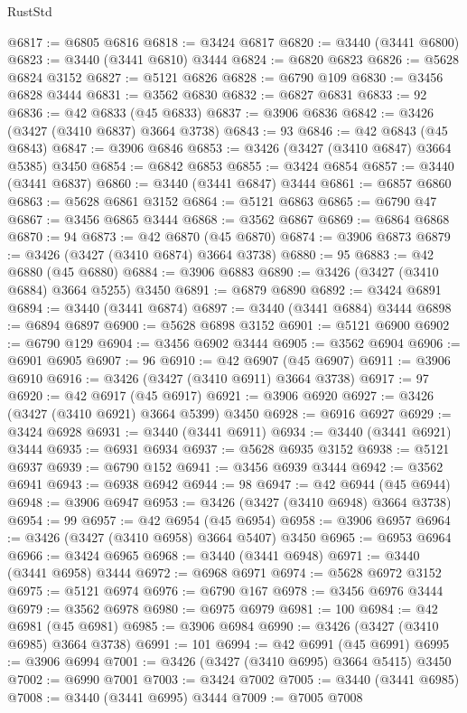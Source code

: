 \begin{lexlean}{RustStd}
\begin{coremodule}
@6817 := @6805 @6816
@6818 := @3424 @6817
@6820 := @3440 (@3441 @6800)
@6823 := @3440 (@3441 @6810) @3444
@6824 := @6820 @6823
@6826 := @5628 @6824 @3152
@6827 := @5121 @6826
@6828 := @6790 @109
@6830 := @3456 @6828 @3444
@6831 := @3562 @6830
@6832 := @6827 @6831
@6833 := 92
@6836 := @42 @6833 (@45 @6833)
@6837 := @3906 @6836
@6842 := @3426 (@3427 (@3410 @6837) @3664 @3738)
@6843 := 93
@6846 := @42 @6843 (@45 @6843)
@6847 := @3906 @6846
@6853 := @3426 (@3427 (@3410 @6847) @3664 @5385) @3450
@6854 := @6842 @6853
@6855 := @3424 @6854
@6857 := @3440 (@3441 @6837)
@6860 := @3440 (@3441 @6847) @3444
@6861 := @6857 @6860
@6863 := @5628 @6861 @3152
@6864 := @5121 @6863
@6865 := @6790 @47
@6867 := @3456 @6865 @3444
@6868 := @3562 @6867
@6869 := @6864 @6868
@6870 := 94
@6873 := @42 @6870 (@45 @6870)
@6874 := @3906 @6873
@6879 := @3426 (@3427 (@3410 @6874) @3664 @3738)
@6880 := 95
@6883 := @42 @6880 (@45 @6880)
@6884 := @3906 @6883
@6890 := @3426 (@3427 (@3410 @6884) @3664 @5255) @3450
@6891 := @6879 @6890
@6892 := @3424 @6891
@6894 := @3440 (@3441 @6874)
@6897 := @3440 (@3441 @6884) @3444
@6898 := @6894 @6897
@6900 := @5628 @6898 @3152
@6901 := @5121 @6900
@6902 := @6790 @129
@6904 := @3456 @6902 @3444
@6905 := @3562 @6904
@6906 := @6901 @6905
@6907 := 96
@6910 := @42 @6907 (@45 @6907)
@6911 := @3906 @6910
@6916 := @3426 (@3427 (@3410 @6911) @3664 @3738)
@6917 := 97
@6920 := @42 @6917 (@45 @6917)
@6921 := @3906 @6920
@6927 := @3426 (@3427 (@3410 @6921) @3664 @5399) @3450
@6928 := @6916 @6927
@6929 := @3424 @6928
@6931 := @3440 (@3441 @6911)
@6934 := @3440 (@3441 @6921) @3444
@6935 := @6931 @6934
@6937 := @5628 @6935 @3152
@6938 := @5121 @6937
@6939 := @6790 @152
@6941 := @3456 @6939 @3444
@6942 := @3562 @6941
@6943 := @6938 @6942
@6944 := 98
@6947 := @42 @6944 (@45 @6944)
@6948 := @3906 @6947
@6953 := @3426 (@3427 (@3410 @6948) @3664 @3738)
@6954 := 99
@6957 := @42 @6954 (@45 @6954)
@6958 := @3906 @6957
@6964 := @3426 (@3427 (@3410 @6958) @3664 @5407) @3450
@6965 := @6953 @6964
@6966 := @3424 @6965
@6968 := @3440 (@3441 @6948)
@6971 := @3440 (@3441 @6958) @3444
@6972 := @6968 @6971
@6974 := @5628 @6972 @3152
@6975 := @5121 @6974
@6976 := @6790 @167
@6978 := @3456 @6976 @3444
@6979 := @3562 @6978
@6980 := @6975 @6979
@6981 := 100
@6984 := @42 @6981 (@45 @6981)
@6985 := @3906 @6984
@6990 := @3426 (@3427 (@3410 @6985) @3664 @3738)
@6991 := 101
@6994 := @42 @6991 (@45 @6991)
@6995 := @3906 @6994
@7001 := @3426 (@3427 (@3410 @6995) @3664 @5415) @3450
@7002 := @6990 @7001
@7003 := @3424 @7002
@7005 := @3440 (@3441 @6985)
@7008 := @3440 (@3441 @6995) @3444
@7009 := @7005 @7008

\end{coremodule}
\end{lexlean}
